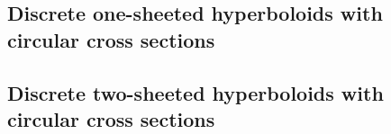 \documentclass[12pt,a4paper]{article}
\begin{document}
\subsection{Discrete one-sheeted hyperboloids with circular cross sections}
\cite{DiscretizationConfocalQuadricsI}
\subsection{Discrete two-sheeted hyperboloids with circular cross sections}
\pagebreak




\end{document}
